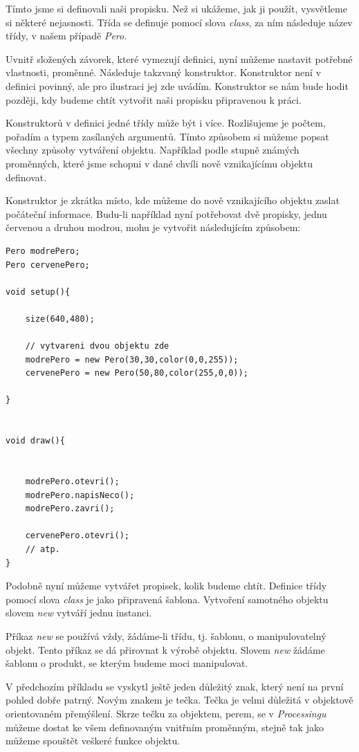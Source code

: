 \documentclass[10pt,twoside=true,open=right,cleardoublepage=empty,chapterprefix=true]{scrbook}
\newcommand{\vyraz}[1]{\textit{\gls{#1}}\index{#1}\label{#1}}
\newcommand{\lnb}{\linebreak}
\begin{document}
Tímto jsme si definovali naši propisku. Než si ukážeme, jak ji použít, vysvětleme si některé nejasnosti. Třída se definuje pomocí slova \vyraz{class}, za ním následuje název třídy, v našem případě {\em Pero}.

Uvnitř složených závorek, které vymezují definici, nyní můžeme nastavit potřebné vlastnosti, proměnné. Následuje takzvaný konstruktor. Konstruktor není v definici povinný, ale pro ilustraci jej zde uvádím. Konstruktor se nám bude hodit později, kdy budeme chtít vytvořit naši propisku připravenou k práci.

Konstruktorů v definici jedné třídy může být i více. Rozlišujeme je počtem, pořadím a typem zasílaných argumentů. Tímto způsobem si můžeme popsat všechny způsoby vytváření objektu. Například podle stupně známých proměnných, které jsme schopni v dané chvíli nově vznikajícímu objektu definovat.

Konstruktor je zkrátka místo, kde můžeme do nově vznikajícího objektu \lnb zaslat počáteční informace. Budu-li například nyní potřebovat dvě propisky, jednu červenou a druhou modrou, mohu je vytvořit následujícím způsobem:




\begin{lstlisting}
Pero modrePero;
Pero cervenePero;

void setup(){

	size(640,480);
	
	// vytvareni dvou objektu zde
	modrePero = new Pero(30,30,color(0,0,255));
	cervenePero = new Pero(50,80,color(255,0,0));

}


void draw(){


	modrePero.otevri();
	modrePero.napisNeco();
	modrePero.zavri();
	
	cervenePero.otevri();
	// atp.
}
\end{lstlisting}

Podobně nyní můžeme vytvářet propisek, kolik budeme chtít. Definice třídy pomocí slova \vyraz{class} je jako připravená šablona. Vytvoření samotného objektu slovem \vyraz{new} vytváří jednu instanci.

Příkaz \vyraz{new} se používá vždy, žádáme-li třídu, tj. šablonu, o manipulovatelný objekt. Tento příkaz se dá přirovnat k výrobě objektu. Slovem \vyraz{new} žádáme šablonu o produkt, se kterým budeme moci manipulovat.

V předchozím příkladu se vyskytl ještě jeden důležitý znak, který není na první pohled dobře patrný. Novým znakem je tečka. Tečka je velmi důležitá v objektově orientovaném přemýšlení. Skrze tečku za objektem, perem, se v {\em Processingu} můžeme dostat ke všem definovaným vnitřním proměnným, stejně tak jako můžeme spouštět veškeré funkce objektu.
\end{document}
